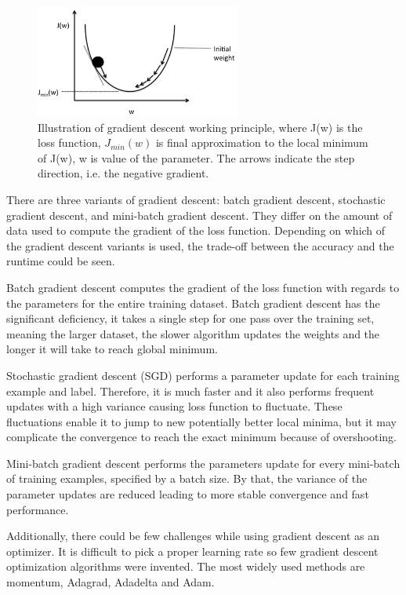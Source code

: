\begin{figure} [H]
\centering
\includegraphics[width=0.6\textwidth]{figures/GDgraph}
\caption{Illustration of gradient descent working principle, where J(w) is the loss function, $J_{min}(w)$ is final approximation to the local minimum of J(w), w is value of the parameter. The arrows indicate the step direction, i.e. the negative gradient.\citep{Raschka2016}}
\label{fig:GDgraph}  
\end{figure}

\noindent
There are three variants of gradient descent: batch gradient descent, stochastic gradient descent, and mini-batch gradient descent. They differ on the amount of data used to compute the gradient of the loss function. Depending on which of the gradient descent variants is used, the trade-off between the accuracy and the runtime could be seen.

\noindent
Batch gradient descent computes the gradient of the loss function with regards to the parameters for the entire training dataset. Batch gradient descent has the significant deficiency, it takes a single step for one pass over the training set, meaning the larger dataset, the slower algorithm updates the weights and the longer it will take to reach global minimum.\citep{Ruder2016} 

\noindent
Stochastic gradient descent (SGD) performs a parameter update for each training example and label. Therefore, it is much faster and it also performs frequent updates with a high variance causing loss function to fluctuate. These fluctuations enable it to jump to new potentially better local minima, but it may complicate the convergence to reach the exact minimum because of overshooting.\citep{Zhang2014}

\noindent
Mini-batch gradient descent performs the parameters update for every mini-batch of training examples, specified by a batch size. By that, the variance of the parameter updates are reduced leading to more stable convergence and fast performance.\citep{Ruder2016}

\noindent
Additionally, there could be few challenges while using gradient descent as an optimizer. It is difficult to pick a proper learning rate so few gradient descent optimization algorithms were invented. The most widely used methods are momentum, Adagrad, Adadelta and Adam.\citep{Ruder2016} 

